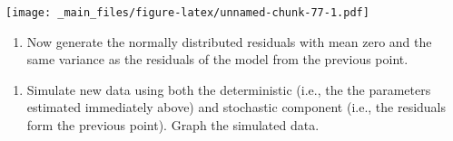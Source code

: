 \documentclass[
]{book}
\newenvironment{Shaded}{\begin{snugshade}}{\end{snugshade}}
\newcommand{\AttributeTok}[1]{\textcolor[rgb]{0.13,0.29,0.53}{#1}}
\newcommand{\CommentTok}[1]{\textcolor[rgb]{0.56,0.35,0.01}{\textit{#1}}}
\newcommand{\DecValTok}[1]{\textcolor[rgb]{0.00,0.00,0.81}{#1}}
\newcommand{\FunctionTok}[1]{\textcolor[rgb]{0.13,0.29,0.53}{\textbf{#1}}}
\newcommand{\NormalTok}[1]{#1}
\newcommand{\OtherTok}[1]{\textcolor[rgb]{0.56,0.35,0.01}{#1}}
\newcommand{\SpecialCharTok}[1]{\textcolor[rgb]{0.81,0.36,0.00}{\textbf{#1}}}
\providecommand{\tightlist}{%
  \setlength{\itemsep}{0pt}\setlength{\parskip}{0pt}}
\begin{document}
\texttt{[image: \_main\_files/figure-latex/unnamed-chunk-77-1.pdf]}

\begin{enumerate}
\def\labelenumi{\arabic{enumi}.}
\setcounter{enumi}{1}
\tightlist
\item
  Now generate the normally distributed residuals with mean zero and the same variance as the residuals of the model from the previous point.
\end{enumerate}

\begin{Shaded}
\end{Shaded}

\begin{enumerate}
\def\labelenumi{\arabic{enumi}.}
\setcounter{enumi}{2}
\tightlist
\item
  Simulate new data using both the deterministic (i.e., the the parameters estimated immediately above) and stochastic component (i.e., the residuals form the previous point). Graph the simulated data.
\end{enumerate}
\end{document}
